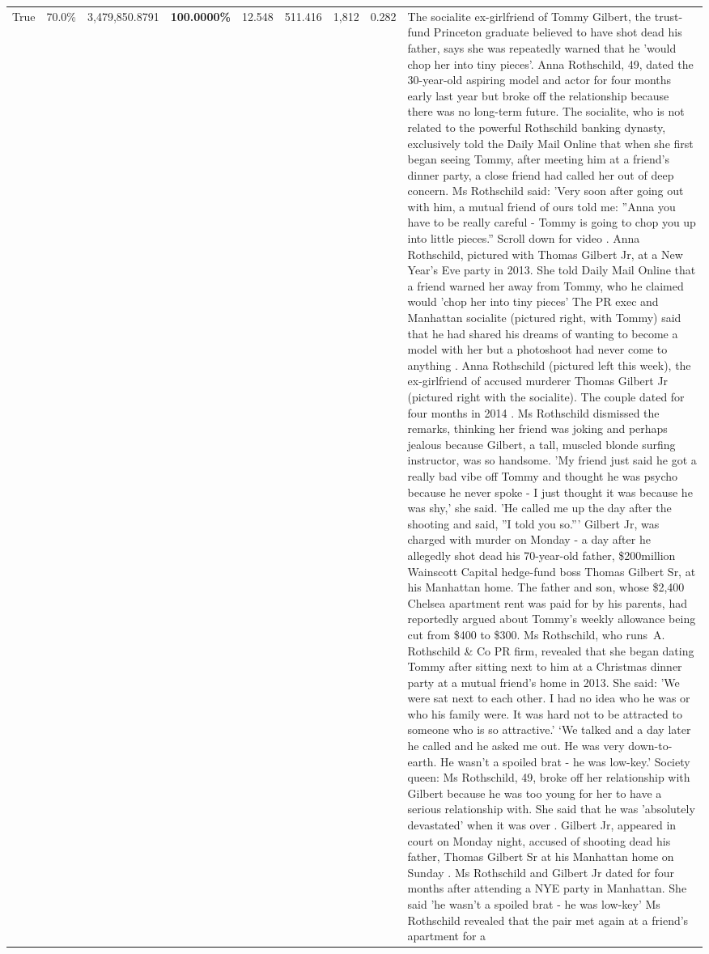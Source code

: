 \begin{table}[H]
\begin{tabular}{lllrlllll}
True & 70.0\% & 3,479,850.8791 & \bfseries \color{red} 100.0000\% & 12.548 & 511.416 & 1,812 & 0.282 & The socialite ex-girlfriend of Tommy Gilbert, the trust-fund Princeton graduate believed to have shot dead his father, says she was repeatedly warned that he 'would chop her into tiny pieces'. Anna Rothschild, 49, dated the 30-year-old aspiring model and actor for four months early last year but broke off the relationship because there was no long-term future. The socialite, who is not related to the powerful Rothschild banking dynasty, exclusively told the Daily Mail Online that when she first began seeing Tommy, after meeting him at a friend's dinner party, a close friend had called her out of deep concern. Ms Rothschild said: 'Very soon after going out with him, a mutual friend of ours told me: ''Anna you have to be really careful - Tommy is going to chop you up into little pieces.'' Scroll down for video . Anna Rothschild, pictured with Thomas Gilbert Jr, at a New Year's Eve party in 2013. She told Daily Mail Online that a friend warned her away from Tommy, who he claimed would 'chop her into tiny pieces' The PR exec and Manhattan socialite (pictured right, with Tommy) said that he had shared his dreams of wanting to become a model with her but a photoshoot had never come to anything . Anna Rothschild (pictured left this week), the ex-girlfriend of accused murderer Thomas Gilbert Jr (pictured right with the socialite). The couple dated for four months in 2014 . Ms Rothschild dismissed the remarks, thinking her friend was joking and perhaps jealous because Gilbert, a tall, muscled blonde surfing instructor, was so handsome. 'My friend just said he got a really bad vibe off Tommy and thought he was psycho because he never spoke - I just thought it was because he was shy,' she said. 'He called me up the day after the shooting and said, ''I told you so.''' Gilbert Jr, was charged with murder on Monday - a day after he allegedly shot dead his 70-year-old father, \$200million Wainscott Capital hedge-fund boss Thomas Gilbert Sr, at his Manhattan home. The father and son, whose \$2,400 Chelsea apartment rent was paid for by his parents, had reportedly argued about Tommy's weekly allowance being cut from \$400 to \$300. Ms Rothschild, who runs A. Rothschild \& Co PR firm, revealed that she began dating Tommy after sitting next to him at a Christmas dinner party at a mutual friend's home in 2013. She said: 'We were sat next to each other. I had no idea who he was or who his family were. It was hard not to be attracted to someone who is so attractive.' ‘We talked and a day later he called and he asked me out. He was very down-to-earth. He wasn’t a spoiled brat - he was low-key.’ Society queen: Ms Rothschild, 49, broke off her relationship with Gilbert because he was too young for her to have a serious relationship with. She said that he was 'absolutely devastated' when it was over . Gilbert Jr, appeared in court on Monday night, accused of shooting dead his father, Thomas Gilbert Sr at his Manhattan home on Sunday . Ms Rothschild and Gilbert Jr dated for four months after attending a NYE party in Manhattan. She said 'he wasn't a spoiled brat - he was low-key' Ms Rothschild revealed that the pair met again at a friend’s apartment for a 
\end{tabular}
\end{table}
